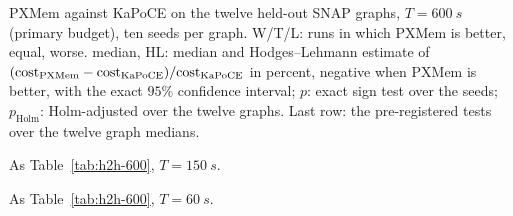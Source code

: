 \begin{table}[!tbp]
\centering
\caption{PXMem against KaPoCE on the twelve held-out SNAP graphs,
$T=\SI{600}{s}$ (primary budget), ten seeds per graph.  W/T/L: runs in
which PXMem is better, equal, worse.  median, HL: median and Hodges--Lehmann
estimate of $(\cost_{\mathrm{PXMem}}-\cost_{\mathrm{KaPoCE}})/
\cost_{\mathrm{KaPoCE}}$ in percent, negative when PXMem is better, with the
exact $95\%$ confidence interval; $p$: exact sign test over the seeds;
$p_{\mathrm{Holm}}$: Holm-adjusted over the twelve graphs.  Last row: the
pre-registered tests over the twelve graph medians.}
\label{tab:h2h-600}
\footnotesize
\setlength{\tabcolsep}{4pt}
\begin{adjustbox}{max width=\textwidth}\end{adjustbox}
\end{table}

\begin{table}[!tbp]
\centering
\caption{As Table~\ref{tab:h2h-600}, $T=\SI{150}{s}$.}
\label{tab:h2h-150}
\footnotesize
\setlength{\tabcolsep}{4pt}
\begin{adjustbox}{max width=\textwidth}\end{adjustbox}
\end{table}

\begin{table}[!tbp]
\centering
\caption{As Table~\ref{tab:h2h-600}, $T=\SI{60}{s}$.}
\label{tab:h2h-60}
\footnotesize
\setlength{\tabcolsep}{4pt}
\begin{adjustbox}{max width=\textwidth}\end{adjustbox}
\end{table}

